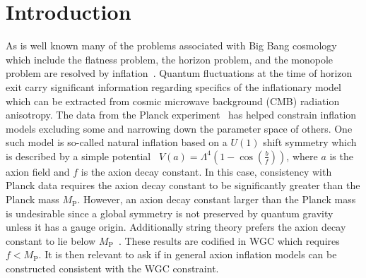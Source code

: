 \documentclass[11pt]{article}
\begin{document}
\section{Introduction \label{sec:Introduction}}
As is well known many of the problems associated with Big Bang cosmology which include
the flatness problem, the horizon problem, and the monopole problem are resolved by inflation~\cite{Guth:1980zm, Starobinsky:1980te, Linde:1981mu, Albrecht:1982wi, Sato:1980yn, Linde:1983gd}.
Quantum fluctuations at the time of horizon exit carry significant information regarding specifics of the inflationary model~\cite{Mukhanov:1981xt, Hawking:1982cz, Starobinsky:1982ee, Guth:1982ec, Bardeen:1983qw, Cheung:2007st} which can be extracted from cosmic microwave background (CMB) radiation anisotropy.
The data from the Planck experiment~\cite{Akrami:2018vks, Akrami:2018odb, Array:2015xqh} has helped constrain inflation models excluding some and narrowing down the parameter space of others.
One such model is so-called natural inflation based on a $U(1)$ shift symmetry which is described by a simple potential~\cite{Freese:1990rb, Adams:1992bn} $V\left(a\right) = \Lambda^4 \left(1 - \cos\left(\frac{b}{f}\right)\right)$, where $a$ is the axion field and $f$ is the axion decay constant.
In this case, consistency with Planck data requires the axion decay constant to be significantly greater than the Planck mass $M_\text{P}$.
However, an axion decay constant larger than the Planck mass is undesirable since a global symmetry is not preserved by quantum gravity unless it has a gauge origin.
Additionally string theory prefers the axion decay constant to lie below $M_\text{P}$~\cite{Banks:2003sx, Svrcek:2006yi}.
These results are codified in WGC which requires $f < M_\text{P}$.
It is then relevant to ask if in general axion inflation models can be constructed consistent with the WGC constraint.
\end{document}
